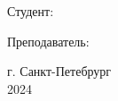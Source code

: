 \begin{titlepage}
\begin{center}
    \vspace{3ex}

    \begin{flushright}
      \begin{minipage}{0.5\textwidth}
        Студент:

	\vspace{2ex}



	\vspace{2ex}

        Преподаватель:


      \end{minipage}
    \end{flushright}

    \vfill

    г. Санкт-Петебрург\\
    2024
  \end{center}
\end{titlepage}

